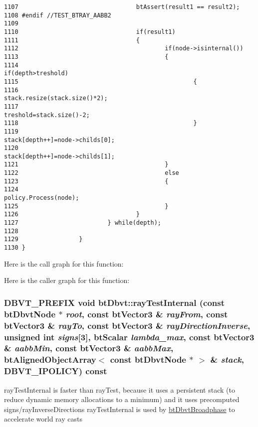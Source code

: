 \begin{Code}
\begin{verbatim}
1107                                 btAssert(result1 == result2);
1108 #endif //TEST_BTRAY_AABB2
1109 
1110                                 if(result1)
1111                                 {
1112                                         if(node->isinternal())
1113                                         {
1114                                                 if(depth>treshold)
1115                                                 {
1116                                                         stack.resize(stack.size()*2);
1117                                                         treshold=stack.size()-2;
1118                                                 }
1119                                                 stack[depth++]=node->childs[0];
1120                                                 stack[depth++]=node->childs[1];
1121                                         }
1122                                         else
1123                                         {
1124                                                 policy.Process(node);
1125                                         }
1126                                 }
1127                         } while(depth);
1128 
1129                 }
1130 }
\end{verbatim}
\end{Code}




Here is the call graph for this function:

Here is the caller graph for this function:\hypertarget{structbt_dbvt_f8f2ca01be7eadc4732464272f580028}{
\subsubsection[rayTestInternal]{\setlength{\rightskip}{0pt plus 5cm}DBVT\_\-PREFIX void btDbvt::rayTestInternal (const btDbvtNode $\ast$ {\em root}, \/  const btVector3 \& {\em rayFrom}, \/  const btVector3 \& {\em rayTo}, \/  const btVector3 \& {\em rayDirectionInverse}, \/  unsigned int {\em signs}\mbox{[}3\mbox{]}, \/  btScalar {\em lambda\_\-max}, \/  const btVector3 \& {\em aabbMin}, \/  const btVector3 \& {\em aabbMax}, \/  {\bf btAlignedObjectArray}$<$ const btDbvtNode $\ast$ $>$ \& {\em stack}, \/  DBVT\_\-IPOLICY) const}}
\label{structbt_dbvt_f8f2ca01be7eadc4732464272f580028}


rayTestInternal is faster than rayTest, because it uses a persistent stack (to reduce dynamic memory allocations to a minimum) and it uses precomputed signs/rayInverseDirections rayTestInternal is used by \hyperlink{structbt_dbvt_broadphase}{btDbvtBroadphase} to accelerate world ray casts 

